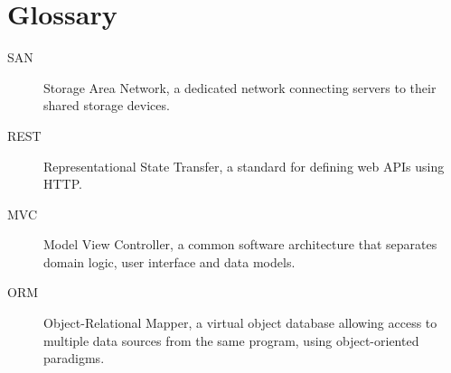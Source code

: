 \chapter*{Glossary}

\begin{description}
\item[SAN]
    Storage Area Network, a dedicated network connecting servers to their
    shared storage devices. \cite{ward2002}
\item[REST]
    Representational State Transfer, a standard for defining web APIs using
    HTTP.
\item[MVC]
    Model View Controller, a common software architecture that separates domain
    logic, user interface and data models.
\item[ORM]
    Object-Relational Mapper, a virtual object database allowing access to
    multiple data sources from the same program, using object-oriented
    paradigms.
\end{description}
